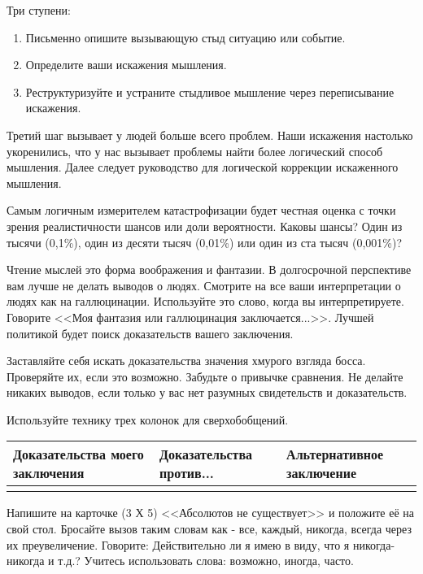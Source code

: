 \documentclass[10pt, fleqn]{article}
\begin{document}
Три ступени:
\begin{enumerate}
\item Письменно опишите вызывающую стыд ситуацию или событие.
\item Определите ваши искажения мышления.
\item Реструктуризуйте и устраните стыдливое мышление через переписывание искажения.
\end{enumerate}

Третий шаг вызывает у людей больше всего проблем. Наши искажения настолько укоренились, что у нас вызывает проблемы найти более логический способ мышления. Далее следует руководство для логической коррекции искаженного мышления.


Самым логичным измерителем катастрофизации будет честная оценка с точки зрения реалистичности шансов или доли вероятности. Каковы шансы? Один из тысячи (0,1\%), один из десяти тысяч (0,01\%) или один из ста тысяч (0,001\%)?


Чтение мыслей это форма воображения и фантазии. В долгосрочной перспективе вам лучше не делать выводов о людях. Смотрите на все ваши интерпретации о людях как на галлюцинации. Используйте это слово, когда вы интерпретируете. Говорите <<Моя фантазия или галлюцинация заключается...>>. Лучшей политикой будет поиск доказательств вашего заключения.


Заставляйте себя искать доказательства значения хмурого взгляда босса. Проверяйте их, если это возможно. Забудьте о привычке сравнения. Не делайте никаких выводов, если только у вас нет разумных свидетельств и доказательств.


Используйте технику трех колонок для сверхобобщений.

\begin{tabular}[c]{|l|l|l|}
\hline
Доказательства моего заключения & Доказательства против... & Альтернативное заключение\\\hline
 & & \\
\end{tabular}

Напишите на карточке (3 Х 5) <<Абсолютов не существует>> и положите её на свой стол. Бросайте вызов таким словам как - все, каждый, никогда, всегда через их преувеличение. Говорите: Действительно ли я имею в виду, что я никогда-никогда и т.д.? Учитесь использовать слова: возможно, иногда, часто.
\end{document}
